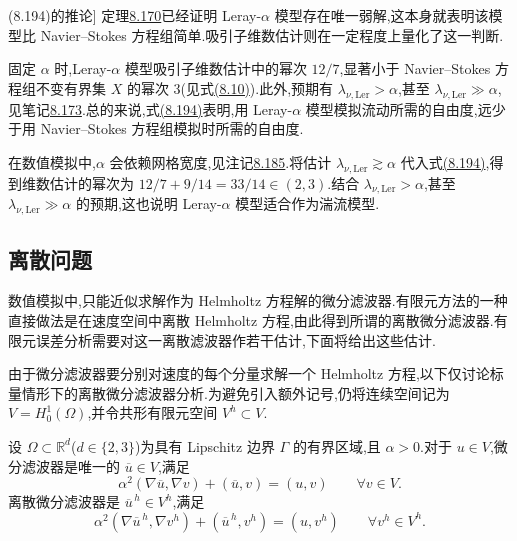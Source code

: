 \begin{note}[估计式\hyperref[eq:leray-alpha-attractor-dimension]{(8.194)}的推论]
\label{note:leray-alpha-attractor-dimension-consequence}
定理\hyperref[thm:leray-alpha-periodic-existence-uniqueness]{8.170}已经证明 Leray-$\alpha$ 模型存在唯一弱解,这本身就表明该模型比 Navier--Stokes 方程组简单.吸引子维数估计则在一定程度上量化了这一判断.

固定 $\alpha$ 时,Leray-$\alpha$ 模型吸引子维数估计中的幂次 $12/7$,显著小于 Navier--Stokes 方程组不变有界集 $X$ 的幂次 $3$(见式\hyperref[eq:hausdorff-dimension-three-dimensional-invariant-set]{(8.10)}).此外,预期有 $\lambda_{\nu,\mathrm{Ler}}>\alpha$,甚至 $\lambda_{\nu,\mathrm{Ler}}\gg\alpha$,见笔记\hyperref[note:leray-alpha-dissipation-length]{8.173}.总的来说,式\hyperref[eq:leray-alpha-attractor-dimension]{(8.194)}表明,用 Leray-$\alpha$ 模型模拟流动所需的自由度,远少于用 Navier--Stokes 方程组模拟时所需的自由度.

在数值模拟中,$\alpha$ 会依赖网格宽度,见注记\hyperref[note:leray-alpha-optimal-alpha-choice]{8.185}.将估计 $\lambda_{\nu,\mathrm{Ler}}\gtrsim\alpha$ 代入式\hyperref[eq:leray-alpha-attractor-dimension]{(8.194)},得到维数估计的幂次为 $12/7+9/14=33/14\in(2,3)$.结合 $\lambda_{\nu,\mathrm{Ler}}>\alpha$,甚至 $\lambda_{\nu,\mathrm{Ler}}\gg\alpha$ 的预期,这也说明 Leray-$\alpha$ 模型适合作为湍流模型.
\end{note}

\subsection{离散问题}
\label{subsec:leray-alpha-discrete-problem}

\begin{note}[微分滤波器在数值模拟中的应用]
\label{note:leray-alpha-discrete-filter-motivation}
数值模拟中,只能近似求解作为 Helmholtz 方程解的微分滤波器.有限元方法的一种直接做法是在速度空间中离散 Helmholtz 方程,由此得到所谓的离散微分滤波器.有限元误差分析需要对这一离散滤波器作若干估计,下面将给出这些估计.

由于微分滤波器要分别对速度的每个分量求解一个 Helmholtz 方程,以下仅讨论标量情形下的离散微分滤波器分析.为避免引入额外记号,仍将连续空间记为 $V=H_0^1(\Omega)$,并令共形有限元空间 $V^h\subset V$.
\end{note}

\begin{note}[微分滤波器与离散微分滤波器]
\label{note:leray-alpha-continuous-discrete-filter}
设 $\Omega\subset\mathbb{R}^d$($d\in\{2,3\}$)为具有 Lipschitz 边界 $\Gamma$ 的有界区域,且 $\alpha>0$.对于 $u\in V$,微分滤波器是唯一的 $\overline{u}\in V$,满足
\begin{equation}\label{eq:leray-alpha-differential-filter}
 \alpha^2(\nabla\overline{u},\nabla v)
  +(\overline{u},v)=(u,v)
 \qquad\forall v\in V.
\end{equation}
离散微分滤波器是 $\overline{u}^{\,h}\in V^h$,满足
\begin{equation}\label{eq:leray-alpha-discrete-differential-filter}
 \alpha^2(\nabla\overline{u}^{\,h},\nabla v^h)
  +(\overline{u}^{\,h},v^h)=(u,v^h)
 \qquad\forall v^h\in V^h.
\end{equation}
\end{note}

